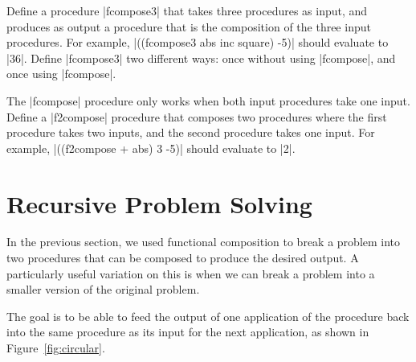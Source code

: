 \begin{schemeregion}
\beforeex
\begin{exercise}
Define a procedure \scheme|fcompose3| that takes three procedures as input, and produces as output a procedure that is the composition of the three input procedures.  For example, \scheme|((fcompose3 abs inc square) -5)| should evaluate to \schemeresult|36|.  Define \scheme|fcompose3| two different ways: once without using \scheme|fcompose|, and once using \scheme|fcompose|.
\end{exercise}
\afterex

\beforeex
\begin{exercise}
The \scheme|fcompose| procedure only works when both input procedures take one input. Define a \scheme|f2compose| procedure that composes two procedures where the first procedure takes two inputs, and the second procedure takes one input.  For example, \scheme|((f2compose + abs) 3 -5)| should evaluate to \scheme|2|.
\end{exercise}
\afterex

\section{Recursive Problem Solving}

In the previous section, we used functional composition to break a problem into two procedures that can be composed to produce the desired output.  A particularly useful variation on this is when we can break a problem into a smaller version of the original problem.  

The goal is to be able to feed the output of one application of the procedure back into the same procedure as its input for the next application, as shown in Figure~\ref{fig:circular}.  


\end{schemeregion}
